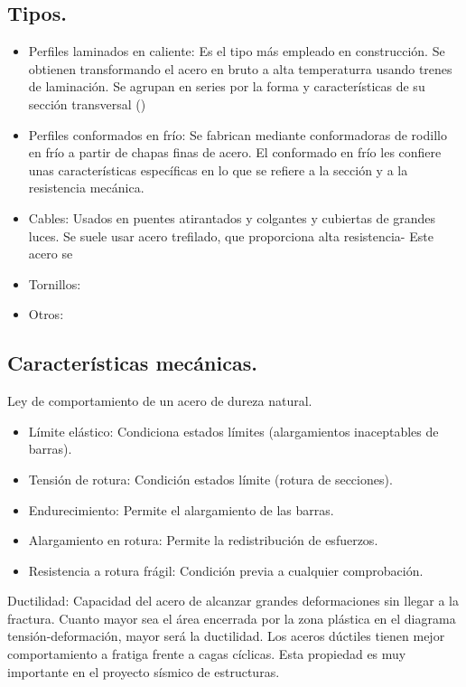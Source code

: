 \subsection{Tipos.}
\begin{itemize}
    \item Perfiles laminados en caliente: Es el tipo más empleado en construcción. Se obtienen transformando el acero en bruto a alta temperaturra usando trenes de laminación. Se agrupan en series por la forma y características de su sección transversal ()
    \item Perfiles conformados en frío: Se fabrican mediante conformadoras de rodillo en frío a partir de chapas finas de acero. El conformado en frío les confiere unas características específicas en lo que se refiere a la sección y a la resistencia mecánica.
    \item Cables: Usados en puentes atirantados y colgantes y cubiertas de grandes luces. Se suele usar acero trefilado, que proporciona alta resistencia- Este acero se
    \item Tornillos:
    \item Otros:
\end{itemize}

\subsection{Características mecánicas.}
Ley de comportamiento de un acero de dureza natural.

\begin{itemize}
    \item Límite elástico: Condiciona estados límites (alargamientos inaceptables de barras).
    \item Tensión de rotura: Condición estados límite (rotura de secciones).
    \item Endurecimiento: Permite el alargamiento de las barras.
    \item Alargamiento en rotura: Permite la redistribución de esfuerzos.
    \item Resistencia a rotura frágil: Condición previa a cualquier comprobación.
\end{itemize}

Ductilidad: Capacidad del acero de alcanzar grandes deformaciones sin llegar a la fractura.
Cuanto mayor sea el área encerrada por la zona plástica en el diagrama tensión-deformación, mayor será la ductilidad.
Los aceros dúctiles tienen mejor comportamiento a fratiga frente a cagas cíclicas.
Esta propiedad es muy importante en el proyecto sísmico de estructuras.

